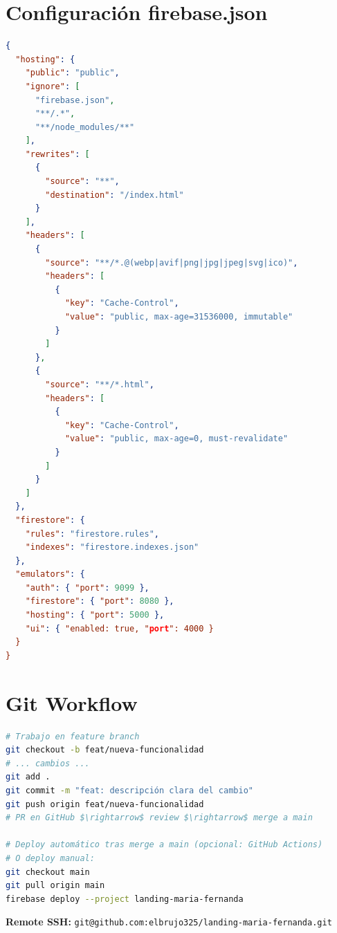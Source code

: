 \documentclass[12pt,a4paper,spanish]{report}
\begin{document}
\section{Configuración firebase.json}
\begin{lstlisting}[language=JSON, caption={firebase.json}]
{
  "hosting": {
    "public": "public",
    "ignore": [
      "firebase.json",
      "**/.*",
      "**/node_modules/**"
    ],
    "rewrites": [
      {
        "source": "**",
        "destination": "/index.html"
      }
    ],
    "headers": [
      {
        "source": "**/*.@(webp|avif|png|jpg|jpeg|svg|ico)",
        "headers": [
          {
            "key": "Cache-Control",
            "value": "public, max-age=31536000, immutable"
          }
        ]
      },
      {
        "source": "**/*.html",
        "headers": [
          {
            "key": "Cache-Control",
            "value": "public, max-age=0, must-revalidate"
          }
        ]
      }
    ]
  },
  "firestore": {
    "rules": "firestore.rules",
    "indexes": "firestore.indexes.json"
  },
  "emulators": {
    "auth": { "port": 9099 },
    "firestore": { "port": 8080 },
    "hosting": { "port": 5000 },
    "ui": { "enabled: true, "port": 4000 }
  }
}
\end{lstlisting}

\section{Git Workflow}
\begin{lstlisting}[language=bash, caption={Git workflow estándar}]
# Trabajo en feature branch
git checkout -b feat/nueva-funcionalidad
# ... cambios ...
git add .
git commit -m "feat: descripción clara del cambio"
git push origin feat/nueva-funcionalidad
# PR en GitHub $\rightarrow$ review $\rightarrow$ merge a main

# Deploy automático tras merge a main (opcional: GitHub Actions)
# O deploy manual:
git checkout main
git pull origin main
firebase deploy --project landing-maria-fernanda
\end{lstlisting}

\textbf{Remote SSH:} \texttt{git@github.com:elbrujo325/landing-maria-fernanda.git}
\end{document}
